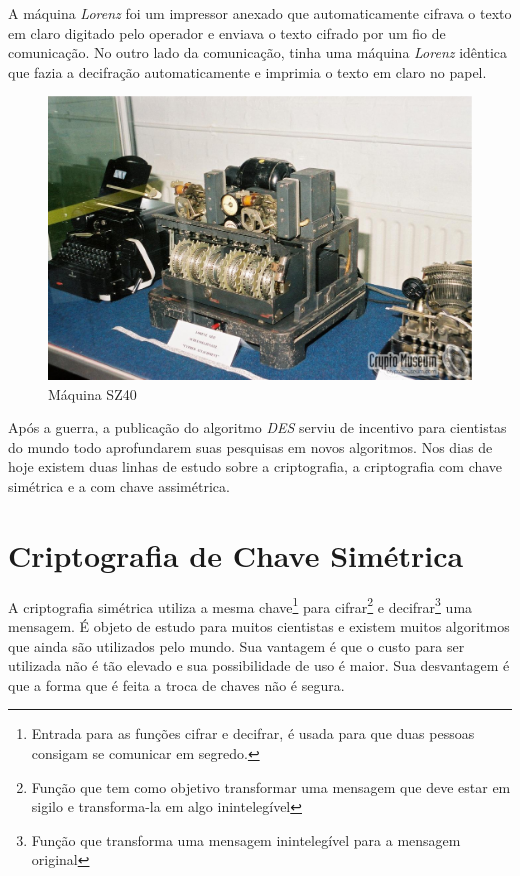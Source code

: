 A máquina \textit{Lorenz} foi um impressor anexado que automaticamente cifrava o texto em claro digitado pelo operador e enviava o texto cifrado por um fio de comunicação. No outro lado da comunicação, tinha uma máquina \textit{Lorenz} idêntica que fazia a decifração automaticamente e imprimia o texto em claro no papel. ~\cite{chris-collins}

\begin{figure}[h]
  \centering
  \includegraphics[keepaspectratio=true,scale=0.2]
  {figuras/sz40.eps}
  \caption[{Máquina SZ40}]{Máquina SZ40\protect\footnotemark}
    \label{sz40-machine}
\end{figure}

Após a guerra, a publicação do algoritmo \textit{DES} serviu de incentivo para cientistas do mundo todo aprofundarem suas pesquisas em novos algoritmos. Nos dias de hoje existem duas linhas de estudo sobre a criptografia, a criptografia com chave simétrica e a com chave assimétrica. 


\section{Criptografia de Chave Simétrica}
\label{symmetric-cryptography}

A criptografia simétrica utiliza a mesma chave\footnote{Entrada para as funções cifrar e decifrar, é usada para que duas pessoas consigam se comunicar em segredo.} para cifrar\footnote{Função que tem como objetivo transformar uma mensagem que deve estar em sigilo e transforma-la em algo inintelegível} e decifrar\footnote{Função que transforma uma mensagem inintelegível para a mensagem original} uma mensagem. É objeto de estudo para muitos cientistas e existem muitos algoritmos que ainda são utilizados pelo mundo. Sua vantagem é que o custo para ser utilizada não é tão elevado e sua possibilidade de uso é maior. Sua desvantagem é que a forma que é feita a troca de chaves não é segura.


